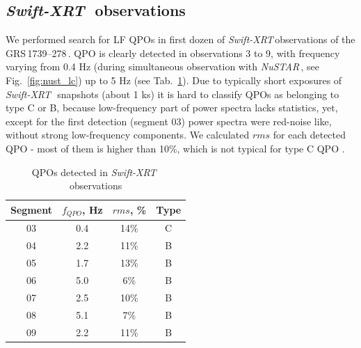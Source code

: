 \documentclass[a4paper,fleqn,usenatbib]{mnras}
\def\grs{{GRS\,1739--278\,}}
\def\swiftx{{\em Swift-XRT\,}}
\def\nustar{{\em NuSTAR\,}}
\begin{document}
\subsection{\swiftx\, observations}
We performed search for LF QPOs in first dozen of \swiftx observations of the \grs. 
QPO is clearly detected in observations 3 to 9, with frequency varying from 0.4 Hz (during simultaneous observation with \nustar, see Fig.~\ref{fig:nust_lc}) up to 5 Hz (see Tab.~\ref{tab:xrtqpo}). 
Due to typically short exposures of \swiftx\, snapshots (about 1 ks) it is hard to classify QPOs as belonging to type C or B, because low-frequency part of power spectra lacks statistics, yet, except for the first detection (segment 03) power spectra were red-noise like, without strong low-frequency components. 
We calculated $rms$ for each detected QPO - most of them is higher than 10\%, which is not typical for type C QPO \citep{casella05}.

\begin{table}
\noindent
\centering
\caption{QPOs detected in \swiftx\, observations}
\label{tab:xrtqpo}
\centering
\begin{tabular}{|c|c|c|c|}
\hline\hline
Segment & $f_{QPO}$, Hz & $rms$, \% & Type\\
\hline
03  &  0.4  &  14\% & C\\
04  &  2.2 &  11\% & B\\
05  &  1.7  & 13\% & B \\ 
06  &  5.0 &   6\% & B\\
07  &  2.5 &  10\% &  B\\ 
08  &  5.1 &   7\% & B\\
09  &  2.2 &  11\% &  B\\
\hline
\end{tabular}
\end{table}
\end{document}
